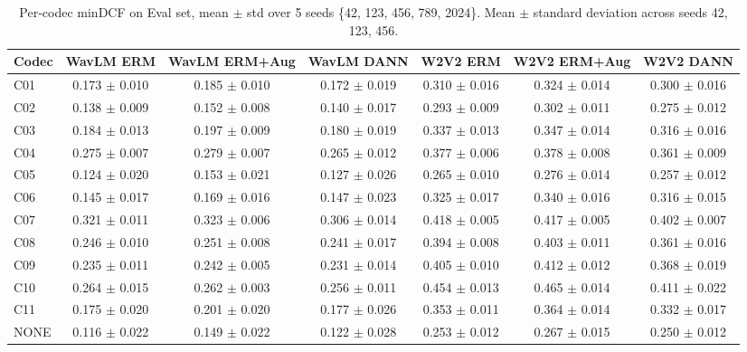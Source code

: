\begin{table}[t]
\centering
\small
\begin{tabular}{lcccccc}
\toprule
Codec & WavLM ERM & WavLM ERM+Aug & WavLM DANN & W2V2 ERM & W2V2 ERM+Aug & W2V2 DANN \\
\midrule
C01 & 0.173 $\pm$ 0.010 & 0.185 $\pm$ 0.010 & 0.172 $\pm$ 0.019 & 0.310 $\pm$ 0.016 & 0.324 $\pm$ 0.014 & 0.300 $\pm$ 0.016 \\
C02 & 0.138 $\pm$ 0.009 & 0.152 $\pm$ 0.008 & 0.140 $\pm$ 0.017 & 0.293 $\pm$ 0.009 & 0.302 $\pm$ 0.011 & 0.275 $\pm$ 0.012 \\
C03 & 0.184 $\pm$ 0.013 & 0.197 $\pm$ 0.009 & 0.180 $\pm$ 0.019 & 0.337 $\pm$ 0.013 & 0.347 $\pm$ 0.014 & 0.316 $\pm$ 0.016 \\
C04 & 0.275 $\pm$ 0.007 & 0.279 $\pm$ 0.007 & 0.265 $\pm$ 0.012 & 0.377 $\pm$ 0.006 & 0.378 $\pm$ 0.008 & 0.361 $\pm$ 0.009 \\
C05 & 0.124 $\pm$ 0.020 & 0.153 $\pm$ 0.021 & 0.127 $\pm$ 0.026 & 0.265 $\pm$ 0.010 & 0.276 $\pm$ 0.014 & 0.257 $\pm$ 0.012 \\
C06 & 0.145 $\pm$ 0.017 & 0.169 $\pm$ 0.016 & 0.147 $\pm$ 0.023 & 0.325 $\pm$ 0.017 & 0.340 $\pm$ 0.016 & 0.316 $\pm$ 0.015 \\
C07 & 0.321 $\pm$ 0.011 & 0.323 $\pm$ 0.006 & 0.306 $\pm$ 0.014 & 0.418 $\pm$ 0.005 & 0.417 $\pm$ 0.005 & 0.402 $\pm$ 0.007 \\
C08 & 0.246 $\pm$ 0.010 & 0.251 $\pm$ 0.008 & 0.241 $\pm$ 0.017 & 0.394 $\pm$ 0.008 & 0.403 $\pm$ 0.011 & 0.361 $\pm$ 0.016 \\
C09 & 0.235 $\pm$ 0.011 & 0.242 $\pm$ 0.005 & 0.231 $\pm$ 0.014 & 0.405 $\pm$ 0.010 & 0.412 $\pm$ 0.012 & 0.368 $\pm$ 0.019 \\
C10 & 0.264 $\pm$ 0.015 & 0.262 $\pm$ 0.003 & 0.256 $\pm$ 0.011 & 0.454 $\pm$ 0.013 & 0.465 $\pm$ 0.014 & 0.411 $\pm$ 0.022 \\
C11 & 0.175 $\pm$ 0.020 & 0.201 $\pm$ 0.020 & 0.177 $\pm$ 0.026 & 0.353 $\pm$ 0.011 & 0.364 $\pm$ 0.014 & 0.332 $\pm$ 0.017 \\
NONE & 0.116 $\pm$ 0.022 & 0.149 $\pm$ 0.022 & 0.122 $\pm$ 0.028 & 0.253 $\pm$ 0.012 & 0.267 $\pm$ 0.015 & 0.250 $\pm$ 0.012 \\
\bottomrule
\end{tabular}
\caption{Per-codec minDCF on Eval set, mean $\pm$ std over 5 seeds \{42, 123, 456, 789, 2024\}. Mean $\pm$ standard deviation across seeds {42, 123, 456}.}
\label{tab:T2_per_codec_mindcf_seeds}
\end{table}
